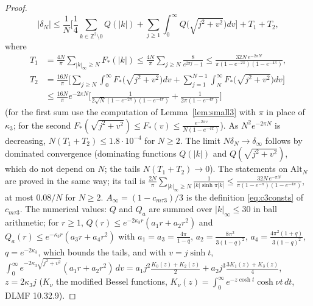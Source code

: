 \documentclass[11pt,a4paper]{article}
\newcommand{\Z}{\mathbb Z}
\theoremstyle{plain}
\theoremstyle{definition}
\numberwithin{equation}{section}
\begin{document}
\begin{proof}
\[
|\delta_N|\le\frac1N\Big[\frac14\sum_{k\in\Z^2\setminus0}Q(|k|)+\sum_{j\ge1}\int_0^\infty Q\big(\sqrt{j^2+v^2}\big)dv\Big]+T_1+T_2,
\]
where
\begin{align*}
T_1&=\frac{4N}\pi\sum_{|k|_\infty\ge N}F_*(|k|)\le\frac{4N}{\pi}\sum_{j\ge N}\frac{8}{e^{2\pi j}-1}\le\frac{32N\,e^{-2\pi N}}{\pi(1-e^{-2\pi})(1-e^{-4\pi})},\\
T_2&=\frac{16N}{\pi}\Big[\sum_{j\ge N}\int_0^\infty F_*\big(\sqrt{j^2+v^2}\big)dv+\sum_{j=1}^{N-1}\int_N^\infty F_*\big(\sqrt{j^2+v^2}\big)dv\Big]\\
&\le\frac{16N}{\pi}e^{-2\pi N}\Big[\frac{1}{2\sqrt N(1-e^{-2\pi})(1-e^{-4\pi})}+\frac{1}{2\pi(1-e^{-4\pi})}\Big]
\end{align*}
(for the first sum use the computation of Lemma~\ref{lem:small3} with $\pi$ in place of $\kappa_3$; for the second $F_*(\sqrt{j^2+v^2})\le F_*(v)\le\frac{e^{-2\pi v}}{N(1-e^{-4\pi})}$). As $N^2e^{-2\pi N}$ is decreasing, $N(T_1+T_2)\le1.8\cdot10^{-4}$ for $N\ge2$. The limit $N\delta_N\to\delta_\infty$ follows by dominated convergence (dominating functions $Q(|k|)$ and $Q(\sqrt{j^2+v^2})$, which do not depend on $N$; the tails $N(T_1+T_2)\to0$). The statements on $\mathrm{Alt}_N$ are proved in the same way; its tail is $\frac{2N}{\pi}\sum_{|k|_\infty\ge N}\frac{1}{|k|\sinh\pi|k|}\le\frac{32N\,e^{-\pi N}}{\pi(1-e^{-\pi})(1-e^{-4\pi})}$, at most $0.08/N$ for $N\ge2$. $A_\infty=(1-c_{m\tau3})/3$ is the definition \eqref{eq:c3consts} of $c_{m\tau3}$.
The numerical values: $Q$ and $Q_a$ are summed over $|k|_\infty\le30$ in ball arithmetic; for $r\ge1$, $Q(r)\le e^{-2\kappa_3r}(a_1r+a_2r^2)$ and $Q_a(r)\le e^{-\kappa_3r}(a_3r+a_4r^2)$ with $a_1=a_3=\frac{4\pi}{1-q}$, $a_2=\frac{8\pi^2}{3(1-q)^2}$, $a_4=\frac{4\pi^2(1+q)}{3(1-q)^2}$, $q=e^{-2\kappa_3}$, which bounds the tails, and with $v=j\sinh t$,
$\int_0^\infty e^{-2\kappa_3\sqrt{j^2+v^2}}(a_1r+a_2r^2)\,dv=a_1j^2\frac{K_0(z)+K_2(z)}{2}+a_2j^3\frac{3K_1(z)+K_3(z)}{4}$, $z=2\kappa_3j$ ($K_\nu$ the modified Bessel functions, $K_\nu(z)=\int_0^\infty e^{-z\cosh t}\cosh\nu t\,dt$, DLMF 10.32.9).
\end{proof}
\end{document}

